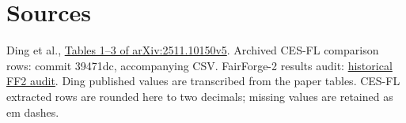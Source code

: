 \documentclass[9pt]{article}
\begin{document}
\section*{Sources}
Ding et al., \href{https://arxiv.org/pdf/2511.10150}{Tables 1--3 of arXiv:2511.10150v5}. Archived CES-FL comparison rows: commit 39471dc, accompanying CSV. FairForge-2 results audit: \href{https://github.com/hardikbha/CFES-BeatDing/blob/39471dc2ab13d51d74d0cfb4fe4052109e20b653/FAIRFORGE2_INDOMAIN_RESULTS_20261031.md}{historical FF2 audit}. Ding published values are transcribed from the paper tables. CES-FL extracted rows are rounded here to two decimals; missing values are retained as em dashes.
\end{document}
